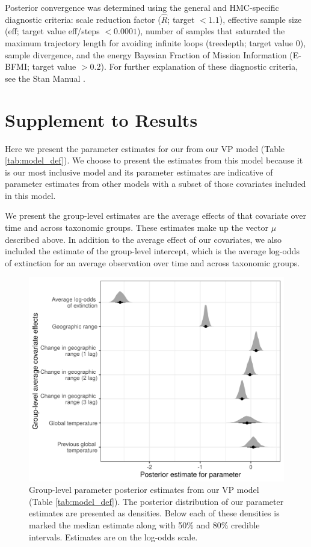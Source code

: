 \documentclass[12pt,letterpaper]{article}
\begin{document}
\begin{refsection}
Posterior convergence was determined using the general and HMC-specific diagnostic criteria: scale reduction factor (\(\hat{R}\); target \(<1.1\)), effective sample size (eff; target value eff/steps \(<0.0001\)), number of samples that saturated the maximum trajectory length for avoiding infinite loops (treedepth; target value 0), sample divergence, and the energy Bayesian Fraction of Mission Information (E-BFMI; target value \(>0.2\)). For further explanation of these diagnostic criteria, see the Stan Manual \citep{StanManual}.

\section{Supplement to Results} \label{sec:supp_res}

Here we present the parameter estimates for our from our VP model (Table \ref{tab:model_def}). We choose to present the estimates from this model because it is our most inclusive model and its parameter estimates are indicative of parameter estimates from other models with a subset of those covariates included in this model.

We present the group-level estimates are the average effects of that covariate over time and across taxonomic groups. These estimates make up the vector $\mu$ described above. In addition to the average effect of our covariates, we also included the estimate of the group-level intercept, which is the average log-odds of extinction for an average observation over time and across taxonomic groups.

\begin{figure}[ht]
  \centering
  \includegraphics{../results/figure/effect_est}
  \caption{Group-level parameter posterior estimates from our VP model (Table \ref{tab:model_def}). The posterior distribution of our parameter estimates are presented as densities. Below each of these densities is marked the median estimate along with 50\% and 80\% credible intervals. Estimates are on the log-odds scale.}
  \label{fig:param_est}
\end{figure}


\end{refsection}
\end{document}
